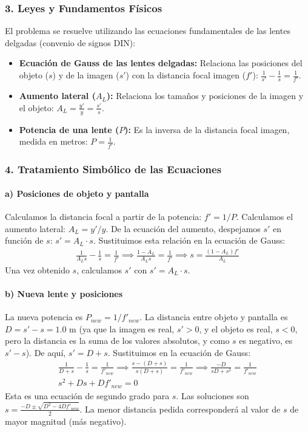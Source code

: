 \subsubsection*{3. Leyes y Fundamentos Físicos}
El problema se resuelve utilizando las ecuaciones fundamentales de las lentes delgadas (convenio de signos DIN):
\begin{itemize}
    \item \textbf{Ecuación de Gauss de las lentes delgadas:} Relaciona las posiciones del objeto ($s$) y de la imagen ($s'$) con la distancia focal imagen ($f'$): $\frac{1}{s'} - \frac{1}{s} = \frac{1}{f'}$.
    \item \textbf{Aumento lateral ($A_L$):} Relaciona los tamaños y posiciones de la imagen y el objeto: $A_L = \frac{y'}{y} = \frac{s'}{s}$.
    \item \textbf{Potencia de una lente ($P$):} Es la inversa de la distancia focal imagen, medida en metros: $P = \frac{1}{f'}$.
\end{itemize}

\subsubsection*{4. Tratamiento Simbólico de las Ecuaciones}
\paragraph*{a) Posiciones de objeto y pantalla}
Calculamos la distancia focal a partir de la potencia: $f' = 1/P$.
Calculamos el aumento lateral: $A_L = y'/y$.
De la ecuación del aumento, despejamos $s'$ en función de $s$: $s' = A_L \cdot s$.
Sustituimos esta relación en la ecuación de Gauss:
\begin{gather}
    \frac{1}{A_L s} - \frac{1}{s} = \frac{1}{f'} \implies \frac{1-A_L}{A_L s} = \frac{1}{f'} \implies s = \frac{(1-A_L)f'}{A_L}
\end{gather}
Una vez obtenido $s$, calculamos $s'$ con $s' = A_L \cdot s$.

\paragraph*{b) Nueva lente y posiciones}
La nueva potencia es $P_{new} = 1/f'_{new}$.
La distancia entre objeto y pantalla es $D = s' - s = 1.0$ m (ya que la imagen es real, $s'>0$, y el objeto es real, $s<0$, pero la distancia es la suma de los valores absolutos, y como $s$ es negativo, es $s' - s$).
De aquí, $s' = D + s$. Sustituimos en la ecuación de Gauss:
\begin{gather}
    \frac{1}{D+s} - \frac{1}{s} = \frac{1}{f'_{new}} \implies \frac{s - (D+s)}{s(D+s)} = \frac{1}{f'_{new}} \implies \frac{-D}{sD+s^2} = \frac{1}{f'_{new}} \nonumber \\
    s^2 + Ds + Df'_{new} = 0
\end{gather}
Esta es una ecuación de segundo grado para $s$. Las soluciones son $s = \frac{-D \pm \sqrt{D^2 - 4Df'_{new}}}{2}$. La menor distancia pedida corresponderá al valor de $s$ de mayor magnitud (más negativo).


